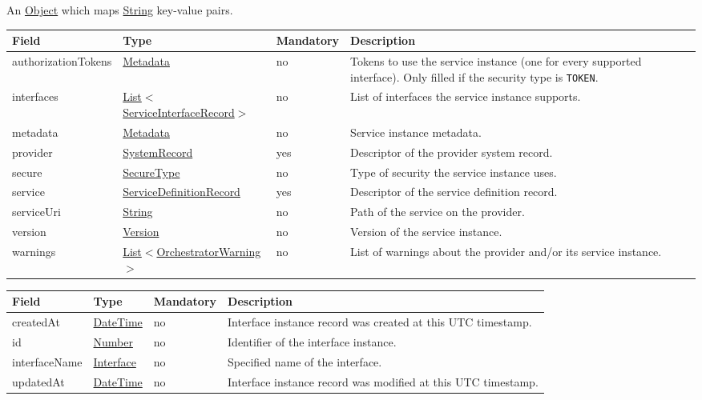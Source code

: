\documentclass[a4paper]{arrowhead}
\newcommand{\pref}[1]{{\textcolor{ArrowheadGrey}{\hyperref[sec:model:primitives:#1]{#1}}}}
\begin{document}
\label{sec:model:Metadata}

An \pref{Object} which maps \pref{String} key-value pairs.

\clearpage

\label{sec:model:OrchestrationResult}

\begin{table}[ht!]
\begin{tabularx}{\textwidth}{| p{3.5cm} | p{4.6cm} | p{2cm} | X |} \hline
\rowcolor{gray!33} Field & Type & Mandatory & Description \\ \hline
authorizationTokens & \hyperref[sec:model:Metadata]{Metadata} & no & Tokens to use the service instance (one for every supported interface). Only filled if the security type is \texttt{TOKEN}. \\ \hline
interfaces & \pref{List}$<$\hyperref[sec:model:ServiceInterfaceRecord]{ServiceInterfaceRecord}$>$ & no & List of interfaces the service instance supports. \\ \hline
metadata & \hyperref[sec:model:Metadata]{Metadata} & no & Service instance metadata. \\ \hline
provider & \hyperref[sec:model:SystemRecord]{SystemRecord} & yes & Descriptor of the provider system record. \\ \hline
secure & \pref{SecureType} & no & Type of security the service instance uses. \\ \hline
service & \hyperref[sec:model:ServiceDefinitionRecord]{ServiceDefinitionRecord} & yes & Descriptor of the service definition record. \\ \hline
serviceUri & \pref{String} & no & Path of the service on the provider. \\ \hline
version & \pref{Version} & no & Version of the service instance. \\ \hline
warnings & \pref{List}$<$\pref{OrchestratorWarning}$>$ & no & List of warnings about the provider and/or its service instance. \\ \hline

\end{tabularx}
\end{table}

\label{sec:model:ServiceInterfaceRecord}

\begin{table}[ht!]
\begin{tabularx}{\textwidth}{| p{4cm} | p{4cm} | p{2cm} | X |} \hline
\rowcolor{gray!33} Field & Type & Mandatory & Description \\ \hline
createdAt & \pref{DateTime} & no & Interface instance record was created at this UTC time\-stamp. \\ \hline
id & \pref{Number} & no & Identifier of the interface instance. \\ \hline
interfaceName &\pref{Interface} & no & Specified name of the interface. \\ \hline
updatedAt & \pref{DateTime} & no & Interface instance record was modified at this UTC time\-stamp. \\ \hline
\end{tabularx}
\end{table}
\end{document}
